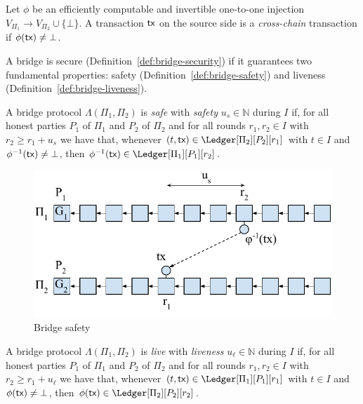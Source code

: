 \begin{definition}
  Let $\phi$ be an efficiently computable and invertible one-to-one
  injection $V_{\Pi_1} \longrightarrow V_{\Pi_2} \cup \{ \bot \}$.
  A transaction $\textsf{tx}$ on the source side is a \emph{cross-chain} transaction if
  $\phi(\textsf{tx}) \neq \bot$.
\end{definition}

A bridge is secure (Definition~\ref{def:bridge-security}) if it guarantees two fundamental properties:
safety (Definition~\ref{def:bridge-safety}) and liveness (Definition~\ref{def:bridge-liveness}).

\begin{definition}\label{def:bridge-safety}
  A bridge protocol $\Lambda(\Pi_1, \Pi_2)$ is \emph{safe} with \emph{safety} $u_s \in \mathbb{N}$
  during $I$ if, for all honest parties $P_1$ of $\Pi_1$ and $P_2$ of $\Pi_2$ and for all rounds
  $r_1, r_2 \in I$ with $r_2 \geq r_1 + u_s$ we have that, whenever $(t, \tx) \in \Ledger[\Pi_2][P_2][r_1]$
  with $t \in I$ and $\phi^{-1}(\textsf{tx}) \neq \bot$, then
  $\phi^{-1}(\tx) \in \Ledger[\Pi_1][P_1][r_2]$.
\end{definition}

\begin{figure}
    \center
    \includegraphics[width=0.8\columnwidth]{figures/bridge-safety.pdf}
    \caption{Bridge safety}
    \label{fig:bridge-safety}
\end{figure}

\begin{definition}\label{def:bridge-liveness}
  A bridge protocol $\Lambda(\Pi_1, \Pi_2)$ is \emph{live} with \emph{liveness} $u_\ell \in \mathbb{N}$
  during $I$ if, for all honest parties $P_1$ of $\Pi_1$ and $P_2$ of $\Pi_2$ and for all rounds
  $r_1, r_2 \in I$ with $r_2 \geq r_1 + u_\ell$ we have that, whenever $(t, \tx) \in \Ledger[\Pi_1][P_1][r_1]$
  with $t \in I$ and $\phi(\textsf{tx}) \neq \bot$, then $\phi(\tx) \in \Ledger[\Pi_2][P_2][r_2]$.
\end{definition}

